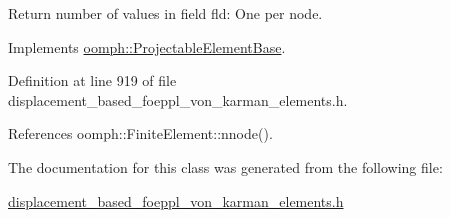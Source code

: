 Return number of values in field fld\+: One per node. 



Implements \hyperlink{classoomph_1_1ProjectableElementBase_a1a9a6de16f3511bca8e8be770abb9c2e}{oomph\+::\+Projectable\+Element\+Base}.



Definition at line 919 of file displacement\+\_\+based\+\_\+foeppl\+\_\+von\+\_\+karman\+\_\+elements.\+h.



References oomph\+::\+Finite\+Element\+::nnode().



The documentation for this class was generated from the following file\+:\begin{DoxyCompactItemize}
\item 
\hyperlink{displacement__based__foeppl__von__karman__elements_8h}{displacement\+\_\+based\+\_\+foeppl\+\_\+von\+\_\+karman\+\_\+elements.\+h}\end{DoxyCompactItemize}
